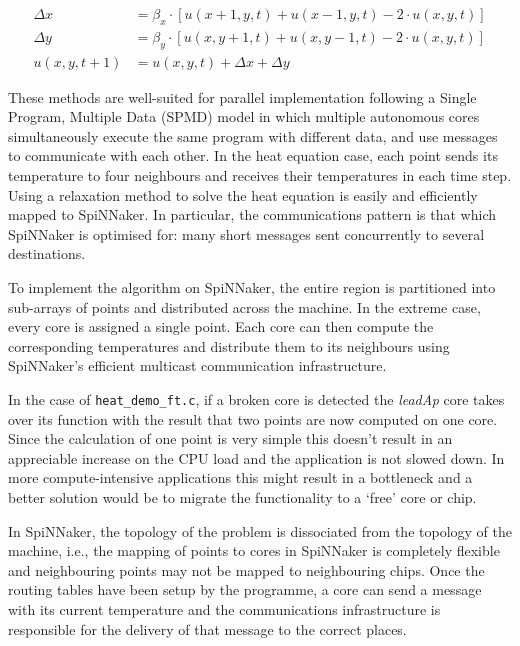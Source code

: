\documentclass[a4paper, 11pt]{article}
\begin{document}
\begin{align*}
\Delta x   &= \beta_x \cdot [u(x+1,y,t) + u(x-1,y,t) - 2 \cdot u(x,y,t)] \\
\Delta y   &= \beta_y \cdot [u(x,y+1,t) + u(x,y-1,t) - 2 \cdot u(x,y,t)] \\
u(x,y,t+1) &= u(x,y,t) + \Delta x + \Delta y
\end{align*}


These methods are well-suited for parallel implementation following a Single Program, Multiple Data (SPMD) model in which multiple autonomous cores simultaneously execute the same program with different data, and use messages to communicate with each other. In the heat equation case, each point sends its temperature to four neighbours and receives their temperatures in each time step. Using a relaxation method to solve the heat equation is easily and efficiently mapped to SpiNNaker. In particular, the communications pattern is that which SpiNNaker is optimised for: many short messages sent concurrently to several destinations.

To implement the algorithm on SpiNNaker, the entire region is partitioned into sub-arrays of points and distributed across the machine. In the extreme case, every core is assigned a single point. Each core can then compute the corresponding temperatures and distribute them to its neighbours using SpiNNaker's efficient multicast communication infrastructure.

In the case of \verb|heat_demo_ft.c|, if a broken core is detected the \emph{leadAp} core takes over its function with the result that two points are now computed on one core. Since the calculation of one point is very simple this doesn't result in an appreciable increase on the CPU load and the application is not slowed down. In more compute-intensive applications this might result in a bottleneck and a better solution would be to migrate the functionality to a `free' core or chip.

In SpiNNaker, the topology of the problem is dissociated from the topology of the machine, i.e., the mapping of points to cores in SpiNNaker is completely flexible and neighbouring points may not be mapped to neighbouring chips. Once the routing tables have been setup by the programme, a core can send a message with its current temperature and the communications infrastructure is responsible for the delivery of that message to the correct places.
\end{document}
